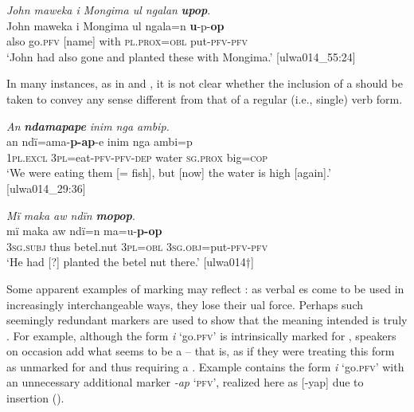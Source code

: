 \ea%
    \label{ex:verbs:49}
          \textit{John maweka i Mongima ul ngalan} \textbf{\textit{upop}}.\\
\gll John  maweka  i    Mongima  ul    ngala=n \textbf{u}{}-p-\textbf{op}\\
    [name]  also    go.\textsc{pfv}  [name]    with  \textsc{pl.prox=obl}     put-\textsc{pfv-pfv}\\

\glt `John had also gone and planted these with Mongima.’ [ulwa014\_55:24]
\z

In many instances, as in  and , it is not clear whether the inclusion of a  should be taken to convey any sense different from that of a regular (i.e., single)  verb form.

\newpage

\ea%
    \label{ex:verbs:50}
          \textit{An} \textbf{\textit{ndamapape}} \textit{inim nga ambip.}\\
\gll    an      ndï=ama-\textbf{p-ap}{}-e     inim  nga      ambi=p\\
    1\textsc{pl.excl}  3\textsc{pl}=eat-\textsc{pfv-pfv-dep}  water  \textsc{sg.prox}  big=\textsc{cop}\\
\glt `We were eating them [= fish], but [now] the water is high [again].’ [ulwa014\_29:36]
\z

\ea%
    \label{ex:verbs:51}
          \textit{Mï maka aw ndïn} \textbf{\textit{mopop}}.\\
\gll mï      maka  aw      ndï=n    ma=u-\textbf{p-op}\\
    \textsc{3sg.subj}  thus  betel.nut  \textsc{3pl=obl}  \textsc{3sg.obj}=put-\textsc{pfv{}-pfv}\\
\glt `He had [?] planted the betel nut there.’ [ulwa014†]
\z

Some apparent examples of  marking may reflect : as verbal es come to be used in increasingly interchangeable ways, they lose their ual force. Perhaps such seemingly redundant  markers are used to show that the meaning intended is truly . For example, although the form \textit{i} ‘go.\textsc{pfv}’ is intrinsically marked for  , speakers on occasion add what seems to be a   -- that is, as if they were treating this form as unmarked for  and thus requiring a  . Example  contains the  form \textit{i} ‘go.\textsc{pfv}’ with an unnecessary additional  marker \textit{-ap} ‘\textsc{pfv}’, realized here as [-yap] due to  insertion ().

